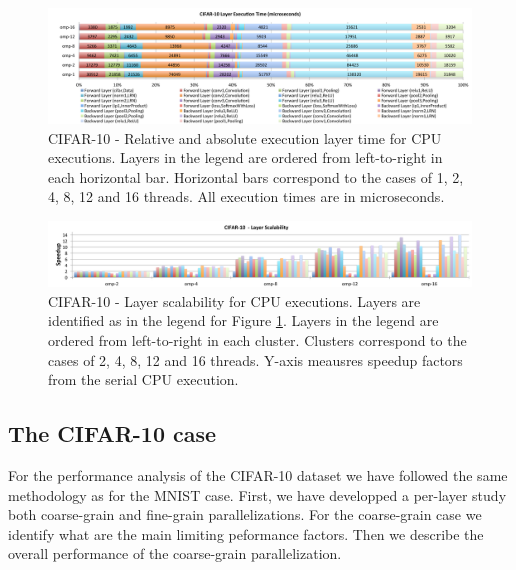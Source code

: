 \begin{figure}[]
\includegraphics[width=\textwidth]{figures/cifar-abs-rel-time.pdf}
\caption{CIFAR-10 - Relative and absolute execution layer time for CPU executions. Layers in the legend are ordered from left-to-right in each horizontal bar. Horizontal bars correspond to the cases of 1, 2, 4, 8, 12 and 16 threads. All execution times are in microseconds.}
\label{fig-cifar-abs-rel}
\end{figure}

\begin{figure}[]
\includegraphics[width=\textwidth]{figures/cifar-scalability-layer.pdf}
\caption{CIFAR-10 - Layer scalability for CPU executions. Layers are identified as in the legend for Figure \ref{fig-cifar-abs-rel}. Layers in the legend are ordered from left-to-right in each cluster. Clusters correspond to the cases of 2, 4, 8, 12 and 16 threads. Y-axis meausres speedup factors from the serial CPU execution.}
\label{fig-cifar-scalability}
\end{figure}

\subsection{The CIFAR-10 case}
For the performance analysis of the CIFAR-10 dataset we have followed the 
same methodology as for the MNIST case. First, we have developped a 
per-layer study both coarse-grain and fine-grain parallelizations. 
For the coarse-grain case we identify what are the main limiting 
peformance factors. Then we describe the overall performance of the 
coarse-grain parallelization. 

